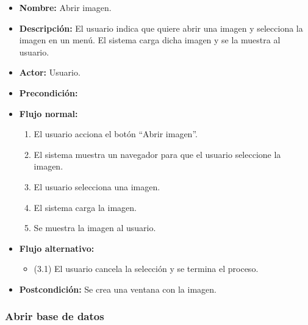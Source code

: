 \begin{itemize}
\item \textbf{Nombre: }Abrir imagen.
\item \textbf{Descripción: }El usuario indica que quiere abrir una imagen y selecciona la imagen en un menú. El sistema carga dicha imagen y se la muestra al usuario.
\item \textbf{Actor: }Usuario.
\item \textbf{Precondición: } 
\item \textbf{Flujo normal: }
\begin{enumerate}
\item El usuario acciona el botón ``Abrir imagen''.
\item El sistema muestra un navegador para que el usuario seleccione la imagen.
\item El usuario selecciona una imagen.
\item El sistema carga la imagen.
\item Se muestra la imagen al usuario.
\end{enumerate}
\item \textbf{Flujo alternativo:}
\begin{itemize}
\item (3.1) El usuario cancela la selección y se termina el proceso.
\end{itemize}
\item \textbf{Postcondición: }Se crea una ventana con la imagen.
\end{itemize}

\subsubsection{Abrir base de datos}

